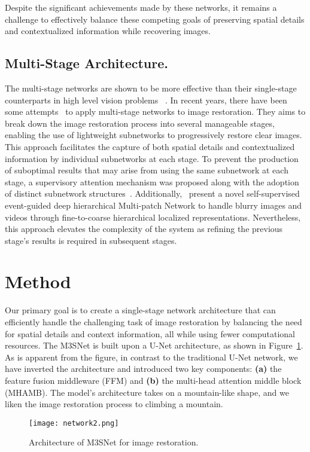 \documentclass[sn-mathphys,Numbered]{sn-jnl}
\theoremstyle{thmstyleone}\newtheorem{theorem}{Theorem}\newtheorem{proposition}[theorem]{Proposition}
\theoremstyle{thmstyletwo}\newtheorem{example}{Example}\newtheorem{remark}{Remark}
\theoremstyle{thmstylethree}\newtheorem{definition}{Definition}
\begin{document}
Despite the significant achievements made by these networks, it remains a challenge to effectively balance these competing goals of preserving spatial details and contextualized information while recovering images.
\subsection{Multi-Stage Architecture.}
The multi-stage networks are shown to be more effective than their single-stage counterparts in high level vision problems  ~\cite{Li2019RethinkingOM,15Cheng2019SPGNetSP,26Ghosh2018StackedSG,45li2020ms}. In recent years, there have been some attempts~\cite{2018Scale,2018Lightweight,RESCAN,PREnet,Zamir2021MPRNet,zhang2022event,Zhang_2019_CVPR} to apply multi-stage networks to image restoration. They aims to break down the image restoration process into several manageable stages, enabling the use of lightweight subnetworks to progressively restore clear images.  This approach facilitates the capture of both spatial details and contextualized information by individual subnetworks at each stage. To prevent the production of suboptimal results that may arise from using the same subnetwork at each stage, a supervisory attention mechanism was proposed along with the adoption of distinct subnetwork structures~\cite{Zamir2021MPRNet}. Additionally,~\cite{zhang2022event} present a novel self-supervised event-guided deep hierarchical Multi-patch Network to handle blurry images and videos through fine-to-coarse hierarchical localized representations.  Nevertheless, this approach elevates the complexity of the system as refining the previous stage's results is required in subsequent stages.

\section{Method}
Our primary goal is to create a single-stage network architecture that can efficiently handle the challenging task of image restoration by balancing the need for spatial details and context information, all while using fewer computational resources. The M3SNet is built upon a U-Net architecture, as shown in Figure~\ref{fig:02}. As is apparent from the figure, in contrast to the traditional U-Net network, we have inverted the architecture and introduced two key components: \textbf{(a)} the feature fusion middleware (FFM) and \textbf{(b)} the multi-head attention middle block (MHAMB). The model's architecture takes on a mountain-like shape, and we liken the image restoration process to climbing a mountain. 
\begin{figure}[tb] \centering
	\texttt{[image: network2.png]}
	\caption{Architecture of M3SNet for image restoration.}
	\label{fig:02}
\end{figure}
\end{document}
